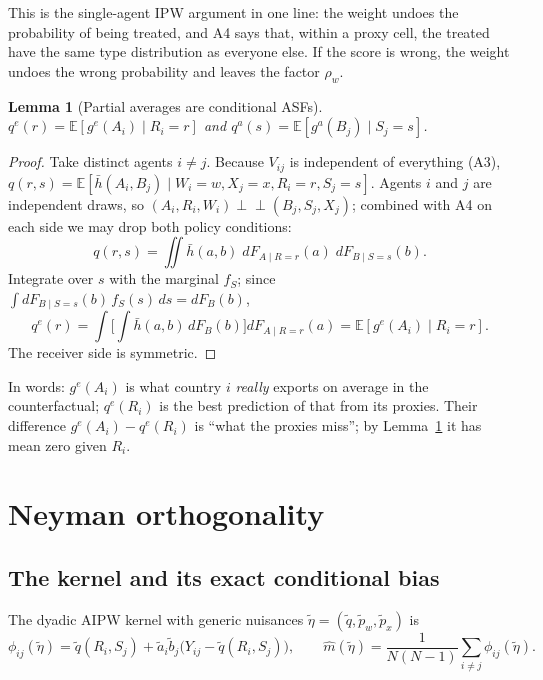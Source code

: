 \documentclass[11pt,a4paper]{article}
\newtheorem{lemma}{Lemma}
\theoremstyle{remark}
\newcommand{\E}{\mathbb{E}}
\newcommand{\1}{\mathbf{1}}
\newcommand{\ind}{\perp\!\!\!\perp}
\newcommand{\qe}{q^{e}}
\newcommand{\qa}{q^{a}}
\newcommand{\gE}{g^{e}}
\newcommand{\gA}{g^{a}}
\begin{document}
\begin{intuitionbox}[Intuition]
This is the single-agent IPW argument in one line: the weight undoes the probability of being treated, and A4 says that, within a proxy cell, the treated have the same type distribution as everyone else. If the score is wrong, the weight undoes the wrong probability and leaves the factor $\rho_w$.
\end{intuitionbox}

\begin{lemma}[Partial averages are conditional ASFs]\label{lem:qe}
$\qe(r)=\E[\gE(A_i)\mid R_i=r]$ and $\qa(s)=\E[\gA(B_j)\mid S_j=s]$.
\end{lemma}

\begin{proof}
Take distinct agents $i\neq j$. Because $V_{ij}$ is independent of everything (A3),
$q(r,s)=\E[\bar h(A_i,B_j)\mid W_i=w,X_j=x,R_i=r,S_j=s]$.
Agents $i$ and $j$ are independent draws, so $(A_i,R_i,W_i)\ind(B_j,S_j,X_j)$; combined with A4 on each side we may drop both policy conditions:
\[
q(r,s)=\iint \bar h(a,b)\;dF_{A\mid R=r}(a)\;dF_{B\mid S=s}(b).
\]
Integrate over $s$ with the marginal $f_S$; since $\int dF_{B\mid S=s}(b)\,f_S(s)\,ds=dF_B(b)$,
\[
\qe(r)=\int\Big[\int \bar h(a,b)\,dF_B(b)\Big]dF_{A\mid R=r}(a)=\E[\gE(A_i)\mid R_i=r].
\]
The receiver side is symmetric.
\end{proof}

\noindent In words: $\gE(A_i)$ is what country $i$ \emph{really} exports on average in the counterfactual; $\qe(R_i)$ is the best prediction of that from its proxies. Their difference $\gE(A_i)-\qe(R_i)$ is ``what the proxies miss''; by Lemma~\ref{lem:qe} it has mean zero given $R_i$.

\section{Neyman orthogonality}

\subsection{The kernel and its exact conditional bias}

The dyadic AIPW kernel with generic nuisances $\tilde\eta=(\tilde q,\tilde p_w,\tilde p_x)$ is
\[
\phi_{ij}(\tilde\eta)=\tilde q(R_i,S_j)+\tilde a_i\tilde b_j\big(Y_{ij}-\tilde q(R_i,S_j)\big),
\qquad
\hat m(\tilde\eta)=\frac{1}{N(N-1)}\sum_{i\neq j}\phi_{ij}(\tilde\eta).
\]
\end{document}
